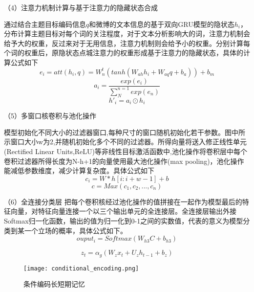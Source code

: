 （4）注意力机制计算与基于注意力的隐藏状态合成

通过结合主题目标编码信息$q$和微博的文本信息的基于双向GRU模型的隐状态$h_i$，分布计算主题目标对每个词的关注程度，对于文本分析影响大的词，注意力机制会给予大的权重，反过来对于无用信息，注意力机制则会给予小的权重。分别计算每个词的权重后，原隐状态点城注意力的权重形成基于注意力的隐藏状态，具体的计算公式如下
\begin{equation}\label{conv1} e_i=att(h_i,q)=W^t_n(tanh(W_{ah}h_i+W_{aq}q+b_a))+b_m \end{equation}
\begin{equation}\label{conv1} a_i=\frac{exp(e_i)}{\sum_{N}^{n=1}exp(e_n)} \end{equation}
\begin{equation}\label{conv1} h'_i=a_i \odot h_i \end{equation}

（5）多窗口核卷积与池化操作

模型初始化不同大小的过滤器窗口,每种尺寸的窗口随机初始化若干参数。图中所示窗口大小w为2,并随机初始化多个不同的过滤器。所得向量将送入修正线性单元(Rectified Linear Units,ReLU)等非线性目标激活函数中,池化操作将卷积层中每个卷积过滤器所得长度为N-h+1的向量使用最大池化操作(max pooling)，池化操作能减低参数维度，减少计算复杂度。具体公式如下
\begin{equation}\label{conv1} c_i=W*h[i:i+w-1]+b \end{equation}
\begin{equation}\label{conv1} c=Max(c_1,c_2,...,c_n) \end{equation}

（6）全连接分类层
把每个卷积核经过池化操作的值拼接在一起作为模型最后的特征向量，对特征向量连接一个以三个输出单元的全连接层。全连接层输出外接Softmax归一化函数，输出的值为归一化到0-1之间的实数值，代表的意义为模型分类到某一个立场的概率，具体公式如下。
\begin{equation}\label{conv1} ouput_i=Softmax(W_{h3}C+b_{h3}) \end{equation}





\begin{equation}\label{conv1} z_t=\alpha_g(W_zx_t+U_zh_{t-1}+b_z) \end{equation}
\begin{figure}[htbp]
	\centering
	\texttt{[image: conditional\_encoding.png]}
	\caption[rnn_vanish]{条件编码长短期记忆}
	\label{hehehe}
\end{figure}

